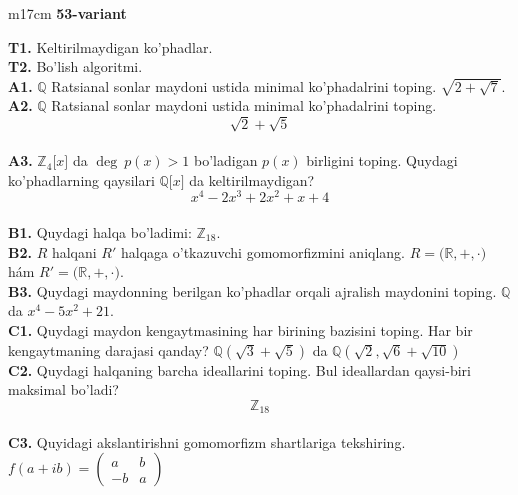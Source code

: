 \documentclass{article}
\begin{document}
\begin{tabular}{m{17cm}}
\textbf{53-variant}
\newline

\textbf{T1.} Keltirilmaydigan ko'phadlar. \\
\textbf{T2.} Bo'lish algoritmi. \\
\textbf{A1.} \(\mathbb{Q}\) Ratsianal sonlar maydoni ustida minimal ko'phadalrini toping.
\(\sqrt{2 + \sqrt{7}}\). \\
\textbf{A2.} \(\mathbb{Q}\) Ratsianal sonlar maydoni ustida minimal ko'phadalrini toping.
\[\sqrt{2} + \sqrt{5}\] \\
\textbf{A3.} \(\mathbb{Z}_{4}\lbrack x\rbrack\) da \(\deg\ p(x) > 1\) bo'ladigan \(p(x)\) birligini toping. Quydagi ko'phadlarning qaysilari \(\mathbb{Q\lbrack}x\rbrack\) da keltirilmaydigan?
\[x^{4} - 2x^{3} + 2x^{2} + x + 4\] \\
\textbf{B1.} Quydagi halqa bo'ladimi:
\(\mathbb{Z}_{18}\). \\
\textbf{B2.} \(R\) halqani \(R'\) halqaga o'tkazuvchi gomomorfizmini aniqlang.
\(R\mathbb{= (R,} + , \cdot )\) hám \(R'\mathbb{= (R,} + , \cdot )\). \\
\textbf{B3.} Quydagi maydonning berilgan ko'phadlar orqali ajralish maydonini toping.
\(\mathbb{Q}\) da \(x^{4} - 5x^{2} + 21\). \\
\textbf{C1.} Quydagi maydon kengaytmasining har birining bazisini toping. Har bir kengaytmaning darajasi qanday?
\(\mathbb{Q}\left( \sqrt{3} + \sqrt{5} \right)\) da \(\mathbb{Q}\left( \sqrt{2},\sqrt{6} + \sqrt{10} \right)\) \\
\textbf{C2.} Quydagi halqaning barcha ideallarini toping. Bul ideallardan qaysi-biri maksimal bo'ladi?
\[\mathbb{Z}_{18}\] \\
\textbf{C3.} Quyidagi akslantirishni gomomorfizm shartlariga tekshiring. \(f(a + ib) = \begin{pmatrix}
a & b \\
 - b & a
\end{pmatrix}\) \\

\end{tabular}
\vspace{1cm}
\end{document}
